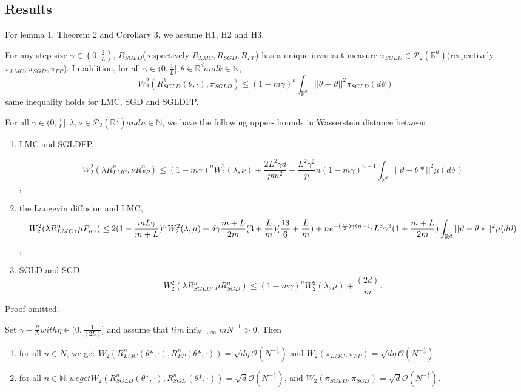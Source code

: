 \subsection{Results}
For lemma 1, Theorem 2 and Corollary 3, we assume H1, H2 and H3.
\begin{lemma}
For any step size $\gamma \in (0, \frac{2}{L})$, $R_{SGLD}$(respectively $R_{LMC}, R_{SGD}, R_{FP}$) has a unique invariant measure $\pi_{SGLD}\in \mathcal{P}_2(\mathbb{R}^d)$(respectively $\pi_{LMC}, \pi_{SGD}, \pi_{FP}$). In addition, for all $\gamma \in (0, \frac{1}{L}], \theta\in \mathbb{R}^d and k\in\mathbb{N}$,
$$W_2^2(R_{SGLD}^k(\theta, \cdot), \pi_{SGLD})\leq(1-m\gamma)^k\int_{\mathbb{R}^d}||\theta-\vartheta||^2\pi_{SGLD}(d\vartheta)$$
same inequality holds for LMC, SGD and SGLDFP.
\end{lemma}
\begin{theorem}
For all $\gamma\in(0,\frac{1}{L}], \lambda, \nu\in \mathcal{P}_2(\mathbb{R}^d) and n\in\mathbb{N}$, we have the following upper- bounds in Wasserstein distance between
\begin{enumerate}
	\item 
	LMC and SGLDFP,

\begin{dmath}	
W_2^2(\lambda R_{LMC}^n, \nu R_{FP}^n)\leq(1-m\gamma)^nW_2^2(\lambda, \nu) + \frac{2L^2\gamma d}{pm^2}+\frac{L^2\gamma^2}{p}n(1-m\gamma)^{n-1}\int_{\mathbb{R}^d}||\vartheta-\theta*||^2 \mu(d\vartheta)
\end{dmath},
	\item 
	the Langevin diffusion and LMC,
\begin{dmath}
W_2^2(\lambda R_{LMC}^n, \mu P_{n\gamma})\leq2(1-\frac{mL\gamma}{m+L})^nW_2^2(\lambda, \mu)+d\gamma\frac{m+L}{2m}(3+\frac{L}{m})(\frac{13}{6}+\frac{L}{m})\\+ne^{-(\frac{m}{2})\gamma(n-1)}L^3\gamma^3(1+\frac{m+L}{2m})\int_{\mathbb{R}^d}||\vartheta - \theta*||^2 \mu(d\vartheta)
\end{dmath},
	\item 
	SGLD and SGD
	\begin{dmath}
	W_2^2(\lambda R_{SGLD}^n, \mu R_{SGD}^n)\leq (1-m\gamma)^n W_2^2(\lambda, \mu)+\frac{(2d)}{m}.
	\end{dmath}
\end{enumerate}
\end{theorem}
Proof omitted.
\begin{cor}
Set $\gamma - \frac{\eta}{N} with \eta \in (0, \frac{1}{(2L)}]$ and assume that $lim \inf_{N \to \infty}mN^{-1}>0$. Then
\begin{enumerate}
\item
for all $n \in N$, we get $W_2(R_{LMC}^n(\theta*, \cdot), R_{FP}^{n}(\theta*, \cdot)) = \sqrt{d\eta}\mathcal{O}(N^{-\frac{1}{2}})$ and $W_2(\pi_{LMC}, \pi_{FP}) = \sqrt{d\eta}\mathcal{O}(N^{-\frac{1}{2}})$.
\item 
for all $n\in \mathbb{N}, we get W_2(R_{SGLD}^{n}(\theta*, \cdot), R^n_{SGD}(\theta*, \cdot)) = \sqrt{d}\mathcal{O}(N^{-\frac{1}{2}})$, and $W_2(\pi_{SGLD}, \pi_{SGD}) = \sqrt{d}\mathcal{O}(N^{-\frac{1}{2}})$.
\end{enumerate}
\end{cor}
